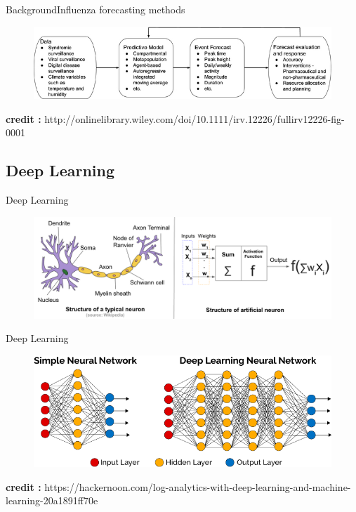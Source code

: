 \documentclass{beamer}
\begin{document}
\begin{frame}{Background}{Influenza forecasting methods}

\begin{figure}[h]
    \centering
    \includegraphics[width=\textwidth]{forcasting.png}
\end{figure}
{\tiny \textbf{credit :} http://onlinelibrary.wiley.com/doi/10.1111/irv.12226/fullirv12226-fig-0001 \par}

\end{frame}

\subsection*{Deep Learning}

\begin{frame}{Deep Learning}{}
\begin{figure}[h]
    \centering
    \includegraphics[width=\textwidth]{neurons-1.png}
\end{figure}
\end{frame}

\begin{frame}{Deep Learning}{}
\begin{figure}[h]
    \centering
    \includegraphics[width=\textwidth]{dl-architecture.png}
\end{figure}

{\tiny \textbf{credit :} https://hackernoon.com/log-analytics-with-deep-learning-and-machine-learning-20a1891ff70e \par}

\end{frame}
\end{document}
